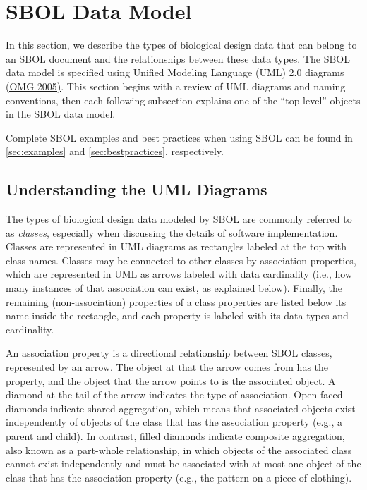 \section{SBOL Data Model}
In this section, we describe the types of biological design data that can belong to an SBOL document and the relationships between these data types. The SBOL data model is specified using Unified Modeling Language (UML) 2.0 diagrams \href{http://www.omg.org/spec/UML/2.0/}{(OMG 2005)}.   
This section begins with a review of UML diagrams and naming conventions, then each following subsection explains one of the ``top-level'' objects in the SBOL data model.

Complete SBOL examples and best practices when using SBOL can be found in \ref{sec:examples} and \ref{sec:bestpractices}, respectively. 

\subsection{Understanding the UML Diagrams}

The types of biological design data modeled by SBOL are commonly referred to as {\em classes}, especially when discussing the details of software implementation. Classes are represented in UML diagrams as rectangles labeled at the top with class names. Classes may be connected to other classes by association properties, which are represented in UML as arrows labeled with data cardinality (i.e., how many instances of that association can exist, as explained below). Finally, the remaining (non-association) properties of a class properties are listed below its name inside the rectangle, and each property is labeled with its data types and cardinality.

An association property is a directional relationship between SBOL classes, represented by an arrow. The object at that the arrow comes from has the property, and the object that the arrow points to is the associated object. A diamond at the tail of the arrow indicates the type of association. Open-faced diamonds indicate shared aggregation, which means that associated objects exist independently of objects of the class that has the association property (e.g., a parent and child). In contrast, filled diamonds indicate composite aggregation, also known as a part-whole relationship, in which objects of the associated class cannot exist independently and must be associated with at most one object of the class that has the association property (e.g., the pattern on a piece of clothing). 

